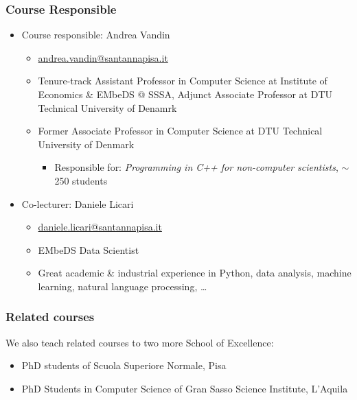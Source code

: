 \documentclass{beamer}%
\begin{document}
\begin{frame}
\frametitle{Course Responsible}
 \begin{itemize}
   \item Course responsible: Andrea Vandin
	\begin{itemize}
      \item\href{mailto:andrea.vandin@santannapisa.it}{\color{blue}andrea.vandin@santannapisa.it}
	  \item Tenure-track Assistant Professor in Computer Science at Institute of Economics \& EMbeDS @ SSSA, Adjunct Associate Professor at DTU Technical University of Denamrk
	  \item Former Associate Professor in Computer Science at DTU Technical University of Denmark
	  \begin{itemize}
      \item 
	   {\scriptsize Responsible for: \emph{Programming in C++ for non-computer scientists}, $\sim$250 students}
	  \end{itemize}
    \end{itemize}
      \item Co-lecturer: Daniele Licari
	\begin{itemize}
	\item \href{mailto:daniele.licari@santannapisa.it}{\color{blue}daniele.licari@santannapisa.it}
	\item EMbeDS Data Scientist 
	\item Great academic \& industrial experience in Python, data analysis, machine learning, natural language processing, \ldots
	\end{itemize}
	\end{itemize}
\end{frame}

\begin{frame}
	\frametitle{Related courses}
	We also teach related courses to two more School of Excellence:
		\begin{itemize}
			\item PhD students of Scuola Superiore Normale, Pisa
			\item PhD Students in Computer Science of Gran Sasso Science Institute, L'Aquila
		\end{itemize}
\end{frame}
\end{document}

